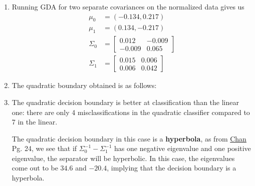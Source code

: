 \documentclass[12pt]{article}
\begin{document}
\begin{enumerate}[label=(\alph*)]
    \item Running GDA for two separate covariances on the normalized data gives us 
    \begin{align*}
        \mu_0 &= (-0.134,0.217) \\
        \mu_1 &= (0.134,-0.217) \\
        \Sigma_0 &= 
        \begin{bmatrix}
            0.012 & -0.009 \\
            -0.009 & 0.065
        \end{bmatrix} \\
        \Sigma_1 &= 
        \begin{bmatrix}
            0.015 & 0.006 \\
            0.006 & 0.042
        \end{bmatrix}
    \end{align*}

    \item The quadratic boundary obtained is as follows: 

    \begin{center}\end{center}

    \item The quadratic decision boundary is better at classification than the linear one: there are only 4 misclassifications in the quadratic classifier compared to 7 in the linear.

    The quadratic decision boundary in this case is a \textbf{hyperbola}, as from \href{https://engineering.purdue.edu/ChanGroup/ECE595/files/chapter2.pdf}{Chan} Pg. 24, we see that if $\Sigma_0^{-1} - \Sigma_1^{-1}$ has one negative eigenvalue and one positive eigenvalue, the separator will be hyperbolic. In this case, the eigenvalues come out to be $34.6$ and $-20.4$, implying that the decision boundary is a hyperbola.

\end{enumerate}
\end{document}
